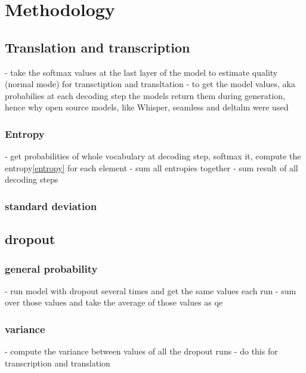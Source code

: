 
\chapter{Methodology}

\section{Translation and transcription}
- take the softmax values at the last layer of the model to estimate quality (normal mode) for transctiption and transltation 
- to get the model values, aka probabilies at each decoding step the models return them during generation, hence why open source models, like Whisper, seamless and deltalm were used
\subsection{Entropy}
- get probabilities of whole vocabulary at decoding step, softmax it, compute the entropy\ref{entropy} for each element 
- sum all entropies together
- sum result of all decoding steps

\subsection{standard deviation}


\section{dropout}
\subsection{ general probability}
- run model with dropout several times and get the same values each run 
- sum over those values and take the average of those values as qe 
\subsection{variance}
- compute the variance between values of all the dropout runs 
- do this for transcription and translation 

